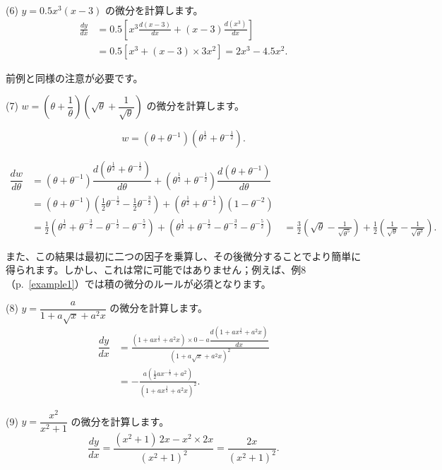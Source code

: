 \documentclass[a4paper,11pt,openany]{ltjsbook}
\newcommand{\Pageref}[2][p.]{#1~\ref{#2}}
\begin{document}
(6) $y = 0.5 x^3(x-3)$ の微分を計算します。
\begin{align*}
\frac{dy}{dx}
  &= 0.5\left[x^3 \frac{d(x-3)}{dx} + (x-3) \frac{d(x^3)}{dx}\right] \\
  &= 0.5\left[x^3 + (x-3) \times  3x^2\right] = 2x^3 - 4.5x^2.
\end{align*}

前例と同様の注意が必要です。

(7) $w = \left(\theta + \dfrac{1}{\theta}\right)
   \left(\sqrt{\theta} + \dfrac{1}{\sqrt{\theta}}\right)$ の微分を計算します。

$$w = (\theta + \theta^{-1})(\theta^{\frac{1}{2}} + \theta^{-\frac{1}{2}}).$$

\[
\begin{aligned}
\dfrac{dw}{d\theta}
  &= (\theta + \theta^{-1})
     \dfrac{d(\theta^{\frac{1}{2}} + \theta^{-\frac{1}{2}})}{d\theta}
   + (\theta^{\frac{1}{2}} + \theta^{-\frac{1}{2}})
     \dfrac{d(\theta+\theta^{-1})}{d\theta} \\
%
  &= (\theta + \theta^{-1})(\tfrac{1}{2}\theta^{-\frac{1}{2}}
                          - \tfrac{1}{2}\theta^{-\frac{3}{2}})
   + (\theta^{\frac{1}{2}} + \theta^{-\frac{1}{2}})(1 - \theta^{-2}) \\
%
  &= \tfrac{1}{2}(\theta^{ \frac{1}{2}} + \theta^{-\frac{3}{2}}
                - \theta^{-\frac{1}{2}} - \theta^{-\frac{5}{2}})
   + (\theta^{ \frac{1}{2}} + \theta^{-\frac{1}{2}}
    - \theta^{-\frac{3}{2}} - \theta^{-\frac{5}{2}}) \
%
  &= \tfrac{3}{2} \left(\sqrt{\theta} - \frac{1}{\sqrt{\theta^5}}\right)
   + \tfrac{1}{2} \left(\frac{1}{\sqrt{\theta}} - \frac{1}{\sqrt{\theta^3}}\right).
\end{aligned}
\]

また、この結果は最初に二つの因子を乗算し、その後微分することでより簡単に得られます。しかし、これは常に可能ではありません；例えば、例8（\Pageref{example1}）では積の微分のルールが必須となります。

(8) $y = \dfrac{a}{1 + a\sqrt{x} + a^2x}$ の微分を計算します。
\begin{align*}
\dfrac{dy}{dx}
  &= \frac{(1 + ax^{\frac{1}{2}} + a^2x) \times  0 - a\dfrac{d(1 + ax^{\frac{1}{2}} + a^2x)}{dx}}
          {(1 + a\sqrt{x} + a^2x)^2} \\
  &= - \frac{a(\frac{1}{2}ax^{-\frac{1}{2}} + a^2)}
            {(1 + ax^{\frac{1}{2}} + a^2x)^2}.
\end{align*}

(9) $y = \dfrac{x^2}{x^2 + 1}$ の微分を計算します。
\[
\dfrac{dy}{dx} = \dfrac{(x^2 + 1)\, 2x - x^2 \times  2x}{(x^2 + 1)^2} = \dfrac{2x}{(x^2 + 1)^2}.
\]
\end{document}
